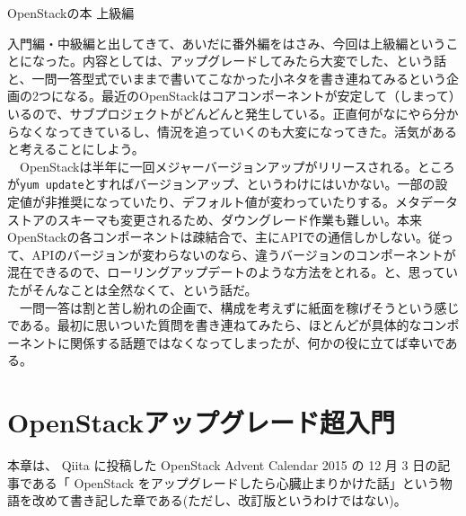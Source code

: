 \documentclass[9pt,b5paper,tombo,openany]{jsbook}
\begin{document}
\noindent
{\Huge OpenStackの本 上級編}

\vspace*{-1in}
\begin{minipage}{0.4\paperwidth}
	\tableofcontents
\end{minipage}

\vspace*{1in}
\begin{minipage}{0.4\paperwidth}
	\begin{spacing}{0.75}
		{\small 入門編・中級編と出してきて、あいだに番外編をはさみ、今回は上級編ということになった。内容としては、アップグレードしてみたら大変でした、という話と、一問一答型式でいままで書いてこなかった小ネタを書き連ねてみるという企画の2つになる。最近のOpenStackはコアコンポーネントが安定して（しまって）いるので、サブプロジェクトがどんどんと発生している。正直何がなにやら分からなくなってきているし、情況を追っていくのも大変になってきた。活気があると考えることにしよう。\\ 　OpenStackは半年に一回メジャーバージョンアップがリリースされる。ところが\verb|yum update|とすればバージョンアップ、というわけにはいかない。一部の設定値が非推奨になっていたり、デフォルト値が変わっていたりする。メタデータストアのスキーマも変更されるため、ダウングレード作業も難しい。本来OpenStackの各コンポーネントは疎結合で、主にAPIでの通信しかしない。従って、APIのバージョンが変わらないのなら、違うバージョンのコンポーネントが混在できるので、ローリングアップデートのような方法をとれる。と、思っていたがそんなことは全然なくて、という話だ。\\ 　一問一答は割と苦し紛れの企画で、構成を考えずに紙面を稼げそうという感じである。最初に思いついた質問を書き連ねてみたら、ほとんどが具体的なコンポーネントに関係する話題ではなくなってしまったが、何かの役に立てば幸いである。}
	\end{spacing}
\end{minipage}

\thispagestyle{empty}

\chapter{OpenStackアップグレード超入門}

\setcounter{page}{1}

本章は、 Qiita に投稿した OpenStack Advent Calendar 2015 の 12 月 3 日の記事である「 OpenStack をアップグレードしたら心臓止まりかけた話」という物語を改めて書き記した章である(ただし、改訂版というわけではない)。
\end{document}
